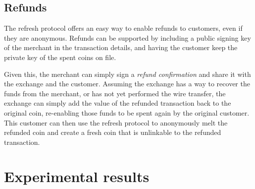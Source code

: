 \documentclass{llncs}
\begin{document}


\subsection{Refunds}

The refresh protocol offers an easy way to enable refunds to
customers, even if they are anonymous.  Refunds can be supported
by including a public signing key of the merchant in the transaction
details, and having the customer keep the private key of the spent
coins on file.

Given this, the merchant can simply sign a {\em refund confirmation}
and share it with the exchange and the customer.  Assuming the
exchange has a way to recover the funds from the merchant, or has not
yet performed the wire transfer, the exchange can simply add the value
of the refunded transaction back to the original coin, re-enabling
those funds to be spent again by the original customer.  This customer
can then use the refresh protocol to anonymously melt the refunded
coin and create a fresh coin that is unlinkable to the refunded
transaction.

\section{Experimental results}
\end{document}
